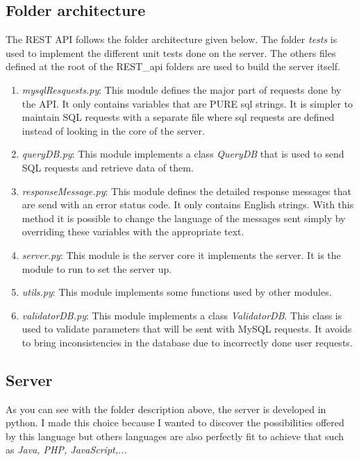 \subsection{Folder architecture}
The REST API follows the folder architecture given below. The folder \textit{tests} is used to implement the different unit tests done on the server. The others files defined at the root of the REST\_api folders are used to build the server itself.


\begin{enumerate}
\item \textit{mysqlResquests.py}: This module defines the major part of requests done by the API. It only contains variables that are PURE sql strings. It is simpler to maintain SQL requests with a separate file where sql requests are defined instead of looking in the core of the server.
\item \textit{queryDB.py}: This module implements a class \textit{QueryDB} that is used to send SQL requests and retrieve data of them.
\item \textit{responseMessage.py}: This module defines the detailed response messages that are send with an error status code. It only contains English strings. With this method it is possible to change the language of the messages sent simply by overriding these variables with the appropriate text.
\item \textit{server.py}: This module is the server core it implements the server. It is the module to run to set the server up.
\item \textit{utils.py}: This module implements some functions used by other modules. 
\item \textit{validatorDB.py}: This module implements a class \textit{ValidatorDB}. This class is used to validate parameters that will be sent with MySQL requests. It avoids to bring inconsistencies in the database due to incorrectly done user requests.
\end{enumerate}
\subsection{Server}
As you can see with the folder description above, the server is developed in python. I made this choice because I wanted to discover the possibilities offered by this language but others languages are also perfectly fit to achieve that such as \textit{Java, PHP, JavaScript,...}\\

